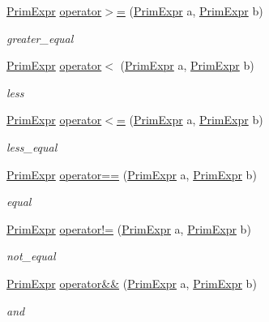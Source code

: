 \begin{DoxyCompactItemize}
\hyperlink{classtvm_1_1PrimExpr}{Prim\+Expr} \hyperlink{namespacetvm_a5530417da455bd46f5dc55f27d69bcdf}{operator$>$=} (\hyperlink{classtvm_1_1PrimExpr}{Prim\+Expr} a, \hyperlink{classtvm_1_1PrimExpr}{Prim\+Expr} b)
\begin{DoxyCompactList}\small\item\em greater\+\_\+equal \end{DoxyCompactList}\item 
\hyperlink{classtvm_1_1PrimExpr}{Prim\+Expr} \hyperlink{namespacetvm_a1f98476c3a413f6cdfc7b7e490f3221b}{operator$<$} (\hyperlink{classtvm_1_1PrimExpr}{Prim\+Expr} a, \hyperlink{classtvm_1_1PrimExpr}{Prim\+Expr} b)
\begin{DoxyCompactList}\small\item\em less \end{DoxyCompactList}\item 
\hyperlink{classtvm_1_1PrimExpr}{Prim\+Expr} \hyperlink{namespacetvm_a598f8139c469abc4066dbdd0a0a0845d}{operator$<$=} (\hyperlink{classtvm_1_1PrimExpr}{Prim\+Expr} a, \hyperlink{classtvm_1_1PrimExpr}{Prim\+Expr} b)
\begin{DoxyCompactList}\small\item\em less\+\_\+equal \end{DoxyCompactList}\item 
\hyperlink{classtvm_1_1PrimExpr}{Prim\+Expr} \hyperlink{namespacetvm_a2ea3b45c96d3980227e418f7158ce5c3}{operator==} (\hyperlink{classtvm_1_1PrimExpr}{Prim\+Expr} a, \hyperlink{classtvm_1_1PrimExpr}{Prim\+Expr} b)
\begin{DoxyCompactList}\small\item\em equal \end{DoxyCompactList}\item 
\hyperlink{classtvm_1_1PrimExpr}{Prim\+Expr} \hyperlink{namespacetvm_a03983cf66713724c138f9697bb8e0e97}{operator!=} (\hyperlink{classtvm_1_1PrimExpr}{Prim\+Expr} a, \hyperlink{classtvm_1_1PrimExpr}{Prim\+Expr} b)
\begin{DoxyCompactList}\small\item\em not\+\_\+equal \end{DoxyCompactList}\item 
\hyperlink{classtvm_1_1PrimExpr}{Prim\+Expr} \hyperlink{namespacetvm_afc83b50366be0862a6c8f88c9a4e62d5}{operator\&\&} (\hyperlink{classtvm_1_1PrimExpr}{Prim\+Expr} a, \hyperlink{classtvm_1_1PrimExpr}{Prim\+Expr} b)
\begin{DoxyCompactList}\small\item\em and \end{DoxyCompactList}\item 

\end{DoxyCompactItemize}
